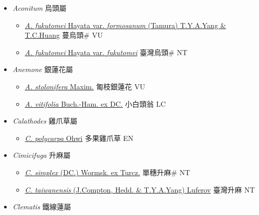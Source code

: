 
  \begin{itemize}
 \item[] \textit{Aconitum} 烏頭屬
                    
  \begin{itemize}
        \item[] \href{http://www.theplantlist.org/tpl1.1/search?q=Aconitum+fukutomei+var.+formosanum}{\textit{A. fukutomei} Hayata var. \textit{formosanum} (Tamura) T.Y.A.Yang \& T.C.Huang}   蔓烏頭\# VU
        \item[] \href{http://www.theplantlist.org/tpl1.1/search?q=Aconitum+fukutomei+var.+fukutomei}{\textit{A. fukutomei} Hayata var. \textit{fukutomei}}   臺灣烏頭\# NT
  \end{itemize}
 \item[] \textit{Anemone} 銀蓮花屬
                    
  \begin{itemize}
        \item[] \href{http://www.theplantlist.org/tpl1.1/search?q=Anemone+stolonifera}{\textit{A. stolonifera} Maxim.}   匍枝銀蓮花 VU
        \item[] \href{http://www.theplantlist.org/tpl1.1/search?q=Anemone+vitifolia}{\textit{A. vitifolia} Buch.-Ham. ex DC.}   小白頭翁 LC
  \end{itemize}
 \item[] \textit{Calathodes} 雞爪草屬
                    
  \begin{itemize}
        \item[] \href{http://www.theplantlist.org/tpl1.1/search?q=Calathodes+polycarpa}{\textit{C. polycarpa} Ohwi}   多果雞爪草 EN
  \end{itemize}
 \item[] \textit{Cimicifuga} 升麻屬
                    
  \begin{itemize}
        \item[] \href{http://www.theplantlist.org/tpl1.1/search?q=Cimicifuga+simplex}{\textit{C. simplex} (DC.) Wormsk. ex Turcz.}   單穗升麻\# NT
        \item[] \href{http://www.theplantlist.org/tpl1.1/search?q=Cimicifuga+taiwanensis}{\textit{C. taiwanensis} (J.Compton, Hedd. \& T.Y.A.Yang) Luferov}   臺灣升麻 NT
  \end{itemize}
 \item[] \textit{Clematis} 鐵線蓮屬
                    

\end{itemize}
